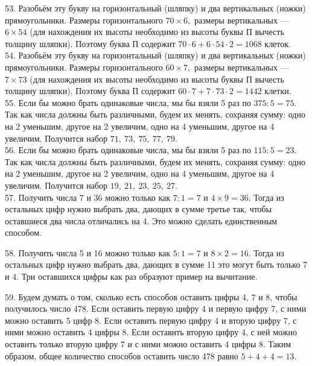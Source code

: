 53. Разобьём эту букву на горизонтальный (шляпку) и два вертикальных (ножки) прямоугольники. Размеры горизонтального $70\times6,$ размеры вертикальных --- $6\times54$ (для нахождения их высоты необходимо из высоты буквы П вычесть толщину шляпки). Поэтому буква П содержит $70\cdot6+6\cdot54\cdot2=1068$ клеток.\\
54. Разобьём эту букву на горизонтальный (шляпку) и два вертикальных (ножки) прямоугольники. Размеры горизонтального $60\times7,$ размеры вертикальных --- $7\times73$ (для нахождения их высоты необходимо из высоты буквы П вычесть толщину шляпки). Поэтому буква П содержит $60\cdot7+7\cdot73\cdot2=1442$ клетки.\\
55. Если бы можно брать одинаковые числа, мы бы взяли 5 раз по $375:5=75.$ Так как числа должны быть различными, будем их менять, сохраняя сумму: одно на 2 уменьшим, другое на 2 увеличим, одно на 4 уменьшим, другое на 4 увеличим. Получится набор $71,\ 73,\ 75,\ 77,\ 79.$\\
56. Если бы можно брать одинаковые числа, мы бы взяли 5 раз по $115:5=23.$ Так как числа должны быть различными, будем их менять, сохраняя сумму: одно на 2 уменьшим, другое на 2 увеличим, одно на 4 уменьшим, другое на 4 увеличим. Получится набор $19,\ 21,\ 23,\ 25,\ 27.$\\
57. Получить числа 7 и 36 можно только как $7:1=7$ и $4\times9=36.$ Тогда из остальных цифр нужно выбрать два, дающих в сумме третье так, чтобы оставшиеся два числа отличались на 4. Это можно сделать единственным способом.
\begin{center}
\begin{figure}[ht!]
\end{figure}
\end{center}
58. Получить числа 5 и 16 можно только как $5:1=7$ и $8\times2=16.$ Тогда из остальных цифр нужно выбрать два, дающих в сумме 11 это могут быть только 7 и 4. Три оставшихся цифры как раз образуют пример на вычитание.
\begin{center}
\begin{figure}[ht!]
\end{figure}
\end{center}
59. Будем думать о том, сколько есть способов оставить цифры 4, 7 и 8, чтобы получилось число 478. Если оставить первую цифру 4 и первую цифру 7, с ними можно оставить 5 цифр 8. Если оставить первую цифру 4 и вторую цифру 7, с ними можно оставить 4 цифры 8. Если оставить вторую цифру 4, с ней можно оставить только вторую цифру 7 и с ними можно оставить 4 цифры 8. Таким образом, общее количество способов оставить число 478 равно $5+4+4=13.$\\
